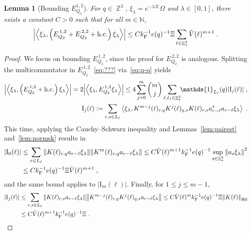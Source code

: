 \documentclass[12pt,a4paper]{article}
\numberwithin{equation}{section}
\newcommand{\cK}{\mathcal{K}}
\newcommand{\NNN}{\mathbb{N}}
\newcommand{\1}{\mathbb{I}}
\newcommand{\F}{\mathrm{F}}
\newcommand{\HS}{\mathrm{HS}}
\newcommand{\I}{\mathrm{I}}
\DeclareMathOperator{\Z}{\mathbb{Z}}
\newcommand{\eva}[1]{\left\langle #1 \right\rangle}
\theoremstyle{plain}
\newtheorem{lemma}[theorem]{Lemma}
\theoremstyle{definition}
\theoremstyle{remark}
\theoremstyle{plain}
\theoremstyle{definition}
\theoremstyle{remark}
\begin{document}
\begin{lemma}[Bounding $E_{Q_2}^{1,2}$]\label{lem:EQ212}
For $ q \in \Z^3 $, $\xi_\lambda = e^{-\lambda \cK} \Omega$ and $ \lambda \in [0,1] $, there exists a constant $ C > 0 $ such that for all $ m \in \NNN $,
\begin{equation}
    \abs{\eva{\xi_\lambda,\left(E^{\,1,2}_{Q_2}+E^{\,2,2}_{Q_2}+\mathrm{h.c.}\right) \xi_\lambda }}
   	\leq C k_{\F}^{-1} e(q)^{-1} \Xi \sum\limits_{\ell \in \Z^3_*} \hat{V}(\ell)^{m+1} \;. \label{eq:estEQ212}
\end{equation}
\end{lemma}

\begin{proof}
We focus on bounding $ E^{\,1,2}_{Q_2} $, since the proof for $ E^{\,2,2}_{Q_2} $ is analogous.
Splitting the multicommutator in $ E^{\,1,2}_{Q_2} $~\eqref{eq:???} via~\eqref{eq:q-q} yields
\begin{equation} \label{eq:EQ2121}
\begin{aligned}
	\abs{\eva{\xi_\lambda,\left(E^{\,1,2}_{Q_2}+\mathrm{h.c.}\right) \xi_\lambda }} 
	= 2\abs{\eva{\xi_\lambda, E^{\,1,2}_{Q_2} \xi_\lambda }}
	\le 4 \sum_{j=0}^m {{m}\choose j} \sum\limits_{\ell,\ell_1  \in \Z^3_*}\!\! \mathds{1}_{L_\ell}(q) |\I_j(\ell)| \;,\\
	\I_j(\ell)
	:= \sum\limits_{r,s\in L_{\ell}}
		\eva{\xi_\lambda, K^{m-j}(\ell)_{r,q} K^{j}(\ell)_{q,s} K(\ell)_{r,s} a^*_{r-\ell} a_{r-\ell} \xi_\lambda} \;. \\
\end{aligned}
\end{equation}
This time, applying the Cauchy--Schwarz inequality and Lemmas~\ref{lem:pairest} and~\ref{lem:normsk} results in
\begin{align}
	|\I_0(\ell)|
	&\leq \sum\limits_{r\in L_{\ell}} \norm{ K(\ell)_{r,q} a_{r-\ell} \xi_\lambda}\norm{ K^m(\ell)_{r,q}  a_{r-\ell} \xi_\lambda }
	\leq C \hat{V}(\ell)^{m+1} k_{\F}^{-1} e(q)^{-1} \sup\limits_{s \in \Z^3_*} \norm{a_s \xi_\lambda}^2 \nonumber\\
	&\leq C k_{\F}^{-1} e(q)^{-1} \Xi \hat{V}(\ell)^{m+1} \;,\label{eq:estEQ2121}
\end{align}
and the same bound applies to $ |\I_m(\ell)| $. Finally, for $ 1 \le j \le m-1 $,
\begin{align}
    |\I_j(\ell)|
    &\leq \sum\limits_{r,s\in L_{\ell}}  \norm{ K(\ell)_{r,s} a_{r-\ell}\xi_\lambda}\norm{ K^{m-j}(\ell)_{r,q} K^{j}(\ell)_{q,s} a_{r-\ell} \xi_\lambda }
    \leq C \hat{V}(\ell)^m k_{\F}^{-1} e(q)^{-1} \Xi \norm{K(\ell)}_{\HS} \nonumber\\
    &\leq C \hat{V}(\ell)^{m+1} k_{\F}^{-1} e(q)^{-1} \Xi \;. \label{eq:estEQ2122}
\end{align}
\end{proof}
\end{document}

